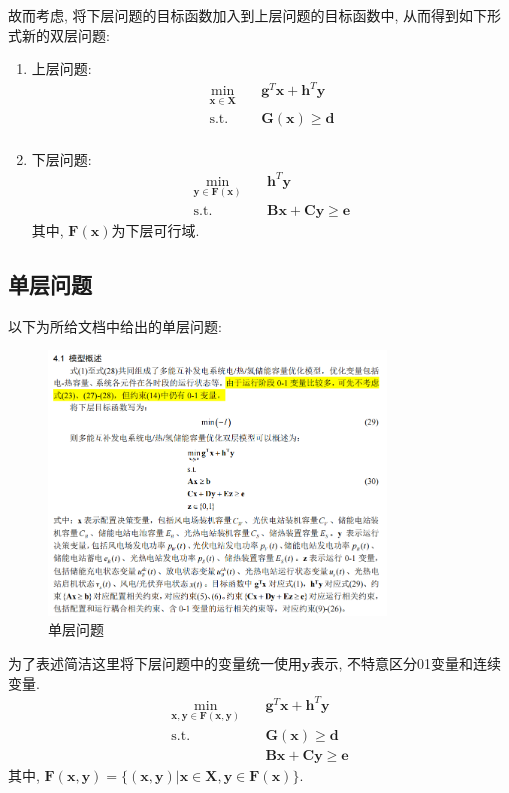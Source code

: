 \documentclass{article}
\begin{document}
故而考虑, 将下层问题的目标函数加入到上层问题的目标函数中, 从而得到如下形式新的双层问题:
\begin{enumerate}
    \item {上层问题:
        \begin{align}
            \min\limits_{\boldsymbol{x}\in\boldsymbol{X}}\quad & \boldsymbol{g}^T\boldsymbol{x}+\boldsymbol{h}^T\boldsymbol{y}  \label{UL_obj2} \\
            \mathrm{s.t.}\quad &\boldsymbol{G(x)}\geq \boldsymbol{d}  \label{UL_con12} \\
        \end{align}
    }
    \item {下层问题:
        \begin{align}
            \min\limits_{\boldsymbol{y}\in\boldsymbol{F(x)}}\quad & \boldsymbol{h}^T\boldsymbol{y} \\
            \mathrm{s.t.}\quad &\boldsymbol{Bx}+\boldsymbol{Cy}\geq \boldsymbol{e}
        \end{align}
        其中, $\boldsymbol{F(x)}$为下层可行域.
    }
\end{enumerate}

\subsection{单层问题}
以下为所给文档中给出的单层问题:
\begin{figure}[H]
    \centering
    \includegraphics[width=0.8\textwidth]{./pic/单层问题.png}
    \caption{单层问题}
    \label{fig:single_level_programming}
\end{figure}
为了表述简洁这里将下层问题中的变量统一使用$\boldsymbol{y}$表示, 不特意区分01变量和连续变量.
\begin{align}
    \min\limits_{\boldsymbol{x,y}\in\boldsymbol{F(x,y)}}\quad & \boldsymbol{g}^T\boldsymbol{x}+\boldsymbol{h}^T\boldsymbol{y}\\
    \mathrm{s.t.}\quad &\boldsymbol{G(x)}\geq \boldsymbol{d} \\
    &\boldsymbol{Bx}+\boldsymbol{Cy}\geq \boldsymbol{e}
\end{align}
其中, $\boldsymbol{F(x,y)}=\{(\boldsymbol{x,y})|\boldsymbol{x}\in\boldsymbol{X},\boldsymbol{y}\in\boldsymbol{F(x)}\}$.
\end{document}
